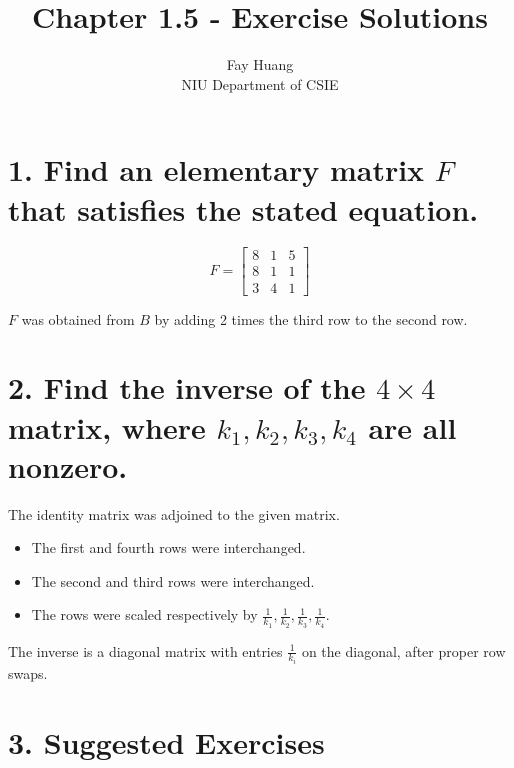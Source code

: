 \documentclass{article}
\title{Chapter 1.5 - Exercise Solutions}
\author{Fay Huang \\ NIU Department of CSIE}
\date{}
\begin{document}
\maketitle

\section*{1. Find an elementary matrix $F$ that satisfies the stated equation.}

\[
F = \begin{bmatrix}
8 & 1 & 5 \\
8 & 1 & 1 \\
3 & 4 & 1
\end{bmatrix}
\]

\noindent $F$ was obtained from $B$ by adding 2 times the third row to the second row.

\section*{2. Find the inverse of the $4 \times 4$ matrix, where $k_1, k_2, k_3, k_4$ are all nonzero.}

The identity matrix was adjoined to the given matrix.

\begin{itemize}
  \item The first and fourth rows were interchanged.
  \item The second and third rows were interchanged.
  \item The rows were scaled respectively by $\frac{1}{k_1}, \frac{1}{k_2}, \frac{1}{k_3}, \frac{1}{k_4}$.
\end{itemize}

\noindent The inverse is a diagonal matrix with entries $\frac{1}{k_i}$ on the diagonal, after proper row swaps.

\section*{3. Suggested Exercises}
\end{document}
